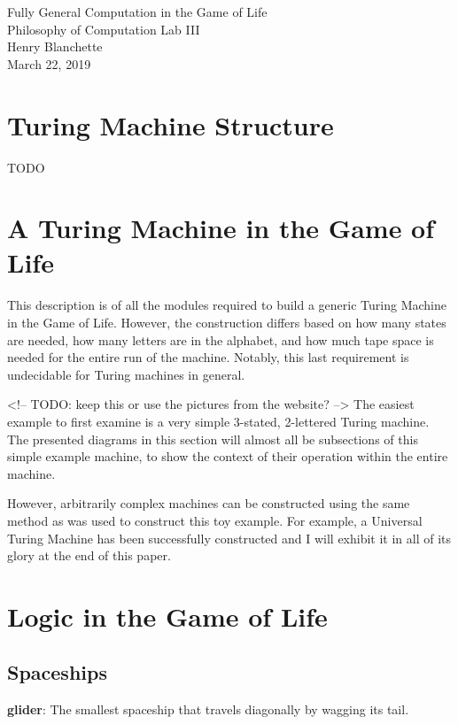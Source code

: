 \documentclass{article}
\begin{document}
\begin{center}{\huge   Fully General Computation in the Game of Life }\\[0.4cm]{\large  Philosophy of Computation Lab III }\\[0.75cm]{\large  Henry Blanchette }\\[0.5cm]{\large  March 22, 2019 }\\[1.0cm]\end{center} \tableofcontents\section{Turing Machine Structure}

TODO

\section{A Turing Machine in the Game of Life}

This description is of all the modules required to build a generic Turing Machine in the Game of Life. However, the construction differs based on how many states are needed, how many letters are in the alphabet, and how much tape space is needed for the entire run of the machine. Notably, this last requirement is undecidable for Turing machines in general.

<!-- TODO: keep this or use the pictures from the website? -->
The easiest example to first examine is a very simple 3-stated, 2-lettered Turing machine. The presented diagrams in this section will almost all be subsections of this simple example machine, to show the context of their operation within the entire machine.

However, arbitrarily complex machines can be constructed using the same method as was used to construct this toy example. For example, a Universal Turing Machine has been successfully constructed and I will exhibit it in all of its glory at the end of this paper.

\section{Logic in the Game of Life}\subsection{Spaceships}
\noindent\textbf{glider}: The smallest spaceship that travels diagonally by wagging its tail.

\vspace{1em}
\end{document}
